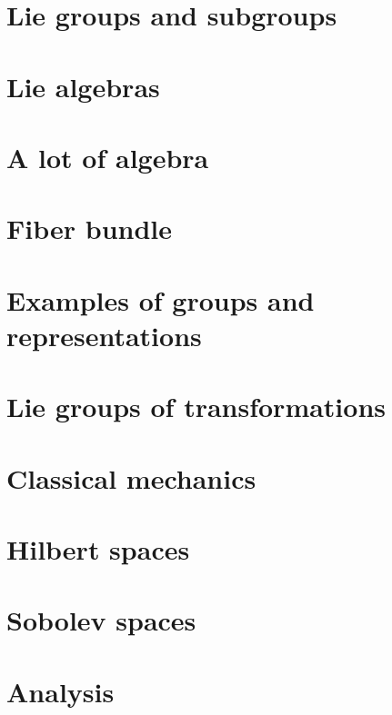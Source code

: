 \documentclass[a4paper,twoside,11pt]{book}
\begin{document}
\chapter{Lie groups and subgroups}


\chapter{Lie algebras}
  
 





\chapter{A lot of algebra}




\chapter{Fiber bundle}



\chapter{Examples of groups and representations}        \label{ChapThoComsGroupes}



\chapter{Lie groups of transformations}


\chapter{Classical mechanics}


\chapter{Hilbert spaces}



\chapter{Sobolev spaces}


\chapter{Analysis}



\end{document}
